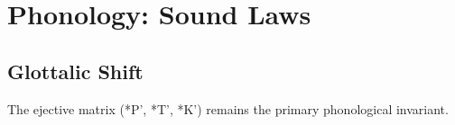 \chapter{Phonology: Sound Laws}\section{Glottalic Shift}The ejective matrix (*P', *T', *K') remains the primary phonological invariant.